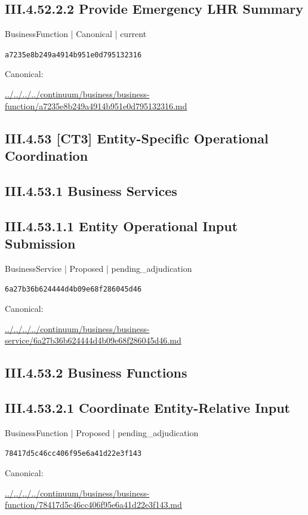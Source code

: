 \documentclass[10pt,a4paper]{article}
\begin{document}
\subsection*{III.4.52.2.2 Provide Emergency LHR Summary}
{\small BusinessFunction | Canonical | current}\par
\texttt{a7235e8b249a4914b951e0d795132316}\par
Canonical: \par
{\footnotesize\url{../../../../continuum/business/business-function/a7235e8b249a4914b951e0d795132316.md}}\par
\subsection*{III.4.53 [CT3] Entity-Specific Operational Coordination}
\subsection*{III.4.53.1 Business Services}
\subsection*{III.4.53.1.1 Entity Operational Input Submission}
{\small BusinessService | Proposed | pending\_adjudication}\par
\texttt{6a27b36b624444d4b09e68f286045d46}\par
Canonical: \par
{\footnotesize\url{../../../../continuum/business/business-service/6a27b36b624444d4b09e68f286045d46.md}}\par
\subsection*{III.4.53.2 Business Functions}
\subsection*{III.4.53.2.1 Coordinate Entity-Relative Input}
{\small BusinessFunction | Proposed | pending\_adjudication}\par
\texttt{78417d5c46cc406f95e6a41d22e3f143}\par
Canonical: \par
{\footnotesize\url{../../../../continuum/business/business-function/78417d5c46cc406f95e6a41d22e3f143.md}}\par
\end{document}
